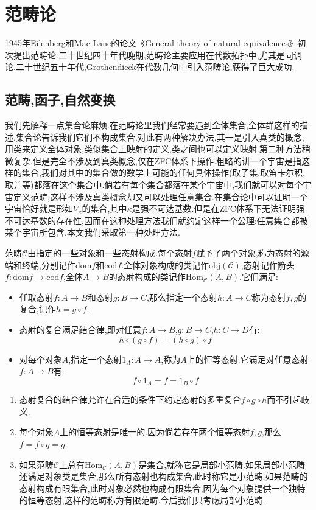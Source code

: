 \chapter{范畴论}

1945年Eilenberg和Mac Lane的论文《General theory of natural equivalences》初次提出范畴论.二十世纪四十年代晚期,范畴论主要应用在代数拓扑中,尤其是同调论.二十世纪五十年代,Grothendieck在代数几何中引入范畴论,获得了巨大成功.
\section{范畴,函子,自然变换}

我们先解释一点集合论麻烦.在范畴论里我们经常要遇到全体集合,全体群这样的描述.集合论告诉我们它们不构成集合.对此有两种解决办法.其一是引入真类的概念,用类来定义全体对象,类似集合上映射的定义,类之间也可以定义映射.第二种方法稍微复杂,但是完全不涉及到真类概念,仅在ZFC体系下操作.粗略的讲一个宇宙是指这样的集合,我们对其中的集合做的数学上可能的任何具体操作(取子集,取笛卡尔积,取并等)都落在这个集合中.倘若有每个集合都落在某个宇宙中,我们就可以对每个宇宙定义范畴,这样不涉及真类概念却又可以处理任意集合.在集合论中可以证明一个宇宙恰好就是形如$V_{\kappa}$的集合,其中$\kappa$是强不可达基数.但是在ZFC体系下无法证明强不可达基数的存在性,因而在这种处理方法我们就约定这样一个公理:任意集合都被某个宇宙所包含.本文我们采取第一种处理方法.

范畴$\mathscr{C}$由指定的一些对象和一些态射构成.每个态射$f$赋予了两个对象,称为态射的源端和终端,分别记作$\mathrm{dom}f$和$\mathrm{cod}f$.全体对象构成的类记作$\mathrm{obj}(\mathscr{C})$,态射记作箭头$f:\mathrm{dom}f\to\mathrm{cod}f$,全体$A\to B$的态射构成的类记作$\mathrm{Hom}_{\mathscr{C}}(A,B)$.它们满足:
\begin{itemize}
	\item 任取态射$f:A\to B$和态射$g:B\to C$,那么指定一个态射$h:A\to C$称为态射$f,g$的复合,记作$h=g\circ f$.
	\item 态射的复合满足结合律,即对任意$f:A\to B$,$g:B\to C$,$h:C\to D$有:
	$$h\circ(g\circ f)=(h\circ g)\circ f$$
	\item 对每个对象$A$,指定一个态射$1_A:A\to A$,称为$A$上的恒等态射.它满足对任意态射$f:A\to B$有:
	$$f\circ 1_A=f=1_B\circ f$$
\end{itemize}
\begin{enumerate}
	\item 态射复合的结合律允许在合适的条件下约定态射的多重复合$f\circ g\circ h$而不引起歧义.
	\item 每个对象$A$上的恒等态射是唯一的.因为倘若存在两个恒等态射$f,g$,那么$f=f\circ g=g$.
	\item 如果范畴$\mathscr{C}$上总有$\mathrm{Hom}_{\mathscr{C}}(A,B)$是集合,就称它是局部小范畴.如果局部小范畴还满足对象类是集合,那么所有态射也构成集合,此时称它是小范畴.如果范畴的态射构成有限集合,此时对象必然也构成有限集合,因为每个对象提供一个独特的恒等态射,这样的范畴称为有限范畴.今后我们只考虑局部小范畴.
\end{enumerate}

